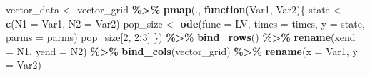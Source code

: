\documentclass[
]{book}
\newenvironment{Shaded}{\begin{snugshade}}{\end{snugshade}}
\newcommand{\AttributeTok}[1]{\textcolor[rgb]{0.13,0.29,0.53}{#1}}
\newcommand{\ControlFlowTok}[1]{\textcolor[rgb]{0.13,0.29,0.53}{\textbf{#1}}}
\newcommand{\DecValTok}[1]{\textcolor[rgb]{0.00,0.00,0.81}{#1}}
\newcommand{\FunctionTok}[1]{\textcolor[rgb]{0.13,0.29,0.53}{\textbf{#1}}}
\newcommand{\NormalTok}[1]{#1}
\newcommand{\OtherTok}[1]{\textcolor[rgb]{0.56,0.35,0.01}{#1}}
\newcommand{\SpecialCharTok}[1]{\textcolor[rgb]{0.81,0.36,0.00}{\textbf{#1}}}
\begin{document}
\begin{Shaded}
\begin{Highlighting}[]
\NormalTok{  vector\_data }\OtherTok{\textless{}{-}}\NormalTok{ vector\_grid }\SpecialCharTok{\%\textgreater{}\%}
    \FunctionTok{pmap}\NormalTok{(., }\ControlFlowTok{function}\NormalTok{(Var1, Var2)\{}
\NormalTok{      state }\OtherTok{\textless{}{-}} \FunctionTok{c}\NormalTok{(}\AttributeTok{N1 =}\NormalTok{ Var1, }\AttributeTok{N2 =}\NormalTok{ Var2)}
\NormalTok{      pop\_size }\OtherTok{\textless{}{-}} \FunctionTok{ode}\NormalTok{(}\AttributeTok{func =}\NormalTok{ LV, }\AttributeTok{times =}\NormalTok{ times, }\AttributeTok{y =}\NormalTok{ state, }\AttributeTok{parms =}\NormalTok{ parms)}
\NormalTok{      pop\_size[}\DecValTok{2}\NormalTok{, }\DecValTok{2}\SpecialCharTok{:}\DecValTok{3}\NormalTok{]}
\NormalTok{    \}) }\SpecialCharTok{\%\textgreater{}\%}
    \FunctionTok{bind\_rows}\NormalTok{() }\SpecialCharTok{\%\textgreater{}\%}
    \FunctionTok{rename}\NormalTok{(}\AttributeTok{xend =}\NormalTok{ N1, }\AttributeTok{yend =}\NormalTok{ N2) }\SpecialCharTok{\%\textgreater{}\%}
    \FunctionTok{bind\_cols}\NormalTok{(vector\_grid) }\SpecialCharTok{\%\textgreater{}\%}
    \FunctionTok{rename}\NormalTok{(}\AttributeTok{x =}\NormalTok{ Var1, }\AttributeTok{y =}\NormalTok{ Var2)}


\end{Highlighting}
\end{Shaded}
\end{document}
